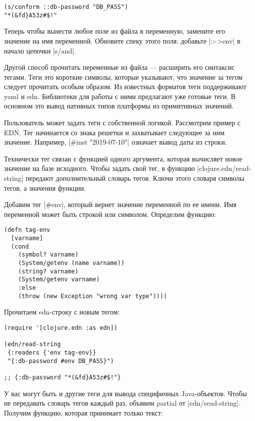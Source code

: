 \begin{verbatim}
(s/conform ::db-password "DB_PASS")
"*(&fd}A53z#$!"
\end{verbatim}

Теперь чтобы вынести любое поле из файла в переменную, замените его значение на
имя переменной. Обновите спеку этого поля: добавьте \spverb|::->env| в начало цепочки
\spverb|s/and|.

Другой способ прочитать переменные из файла — расширить его синтаксис
тегами. Теги это короткие символы, которые указывают, что значение за тегом
следует прочитать особым образом. Из известных форматов теги поддерживают yaml и
edn. Библиотеки для работы с ними предлагают уже готовые теги. В основном это
вывод нативных типов платформы из примитивных значений.

Пользователь может задать теги с собственной логикой. Рассмотрим пример с
EDN. Тег начинается со знака решетки и захватывает следующее за ним
значение. Например, \spverb|#inst "2019-07-10"| означает вывод даты из строки.

Технически тег связан с функцией одного аргумента, которая вычисляет новое
значение на базе исходного. Чтобы задать свой тег, в функцию
\spverb|clojure.edn/read-string| передают дополнительный словарь тегов. Ключи этого
словаря символы тегов, а значения функции.

Добавим тег \spverb|#env|, который вернет значение переменной по ее имени. Имя
переменной может быть строкой или символом. Определим функцию:

\begin{verbatim}
(defn tag-env
  [varname]
  (cond
    (symbol? varname)
    (System/getenv (name varname))
    (string? varname)
    (System/getenv varname)
    :else
    (throw (new Exception "wrong var type"))))
\end{verbatim}

Прочитаем edn-строку с новым тегом:

\begin{verbatim}
(require '[clojure.edn :as edn])

(edn/read-string
 {:readers {'env tag-env}}
 "{:db-password #env DB_PASS}")

;; {:db-password "*(&fd}A53z#$!"}
\end{verbatim}

У вас могут быть и другие теги для вывода специфичных Java-объектов. Чтобы не
передавать словарь тегов каждый раз, объявим partial от
\spverb|edn/read-string|. Получим функцию, которая принимает только текст:

